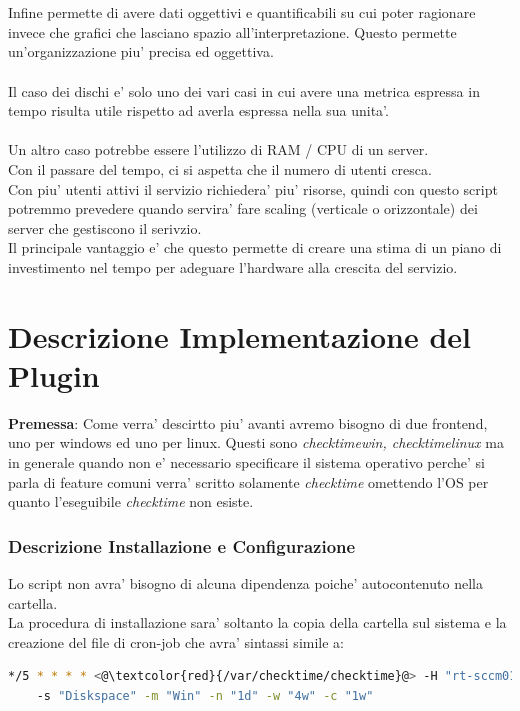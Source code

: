\documentclass{article}
\begin{document}
\\\\
Infine permette di avere dati oggettivi e quantificabili su cui poter ragionare invece che grafici che lasciano spazio all'interpretazione.
Questo permette un'organizzazione piu' precisa ed oggettiva.
\\\\
Il caso dei dischi e' solo uno dei vari casi in cui avere una metrica espressa in tempo risulta utile rispetto ad averla espressa nella sua unita'.
\\\\
Un altro caso potrebbe essere l'utilizzo di RAM / CPU di un server.\\
Con il passare del tempo, ci si aspetta che il numero di utenti cresca.\\
Con piu' utenti attivi il servizio richiedera' piu' risorse, quindi con questo script potremmo prevedere quando servira' fare scaling (verticale o orizzontale) dei server che gestiscono il serivzio.
\\
Il principale vantaggio e' che questo permette di creare una stima di un piano di investimento nel tempo per adeguare l'hardware alla crescita del servizio.


\clearpage

\part*{Descrizione Implementazione del Plugin}
\textbf{Premessa}: Come verra' descirtto piu' avanti avremo bisogno di due frontend, uno per windows ed uno per linux. Questi sono \textit{checktimewin, checktimelinux} ma in generale quando non e' necessario specificare il sistema operativo perche' si parla di feature comuni verra' scritto solamente \textit{checktime} omettendo l'OS per quanto l'eseguibile \textit{checktime} non esiste.
\section*{Descrizione Installazione e Configurazione}
Lo script non avra' bisogno di alcuna dipendenza poiche' autocontenuto nella cartella.\\
La procedura di installazione sara' soltanto la copia della cartella sul sistema e la creazione del file di cron-job che avra' sintassi simile a:

\begin{lstlisting}[language=Bash]
*/5 * * * * <@\textcolor{red}{/var/checktime/checktime}@> -H "rt-sccm01-p1.idolrt.regione.toscana.it"
    -s "Diskspace" -m "Win" -n "1d" -w "4w" -c "1w"
\end{lstlisting}
\end{document}
